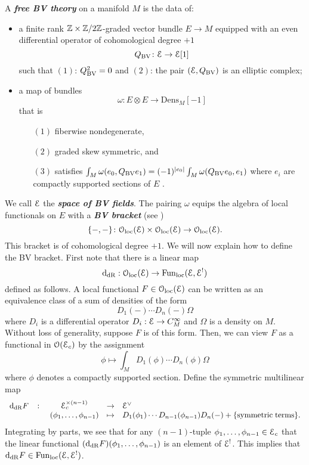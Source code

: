 \documentclass[10pt, oneside]{article}
\newcommand{\Dens}{\mathrm{Dens}}
\newcommand{\defterm}[1]{\textbf{\emph{#1}}}
\begin{document}
\begin{definition}
A \defterm{free BV theory} on a manifold $M$ is the data of:
\begin{itemize}
\item a finite rank $\mathbb Z\times\mathbb Z/2\mathbb Z$-graded vector bundle $E \to M$ equipped with an even differential operator of cohomological degree $+1$
\[
Q_{\mathrm{BV}} \colon \mathcal E \to \mathcal E [1] 
\]
such that $(1)$: $Q_{\mathrm{BV}}^2 = 0$ and $(2)$: the pair $(\mathcal E , Q_{\mathrm{BV}})$ is an elliptic complex;
\item a map of bundles
\[
\omega\colon E \otimes E \to \Dens_M [-1]
\]
that is
\begin{enumerate}
\item[$(1)$] fiberwise nondegenerate,
\item[$(2)$] graded skew symmetric, and
\item[$(3)$] satisfies $\int_M \omega(e_0, Q_{\mathrm{BV}} e_1) = (-1)^{|e_0|} \int_M \omega(Q_{\mathrm{BV}} e_0, e_1)$ where $e_i$ are compactly supported sections of $E$ .
\end{enumerate}
\end{itemize}
\end{definition}

We call $\mathcal E$ the \defterm{space of BV fields}. The pairing $\omega$ equips the algebra of local functionals on $E$ with a \defterm{BV bracket} (see \cite[Chapter 5.3]{CostelloBook}) 
\[
\{-,-\}\colon \mathcal{O}_{\rm loc}(\mathcal E) \times \mathcal{O}_{\rm loc}(\mathcal E) \to \mathcal{O}_{\rm loc}(\mathcal E) .
\]
This bracket is of cohomological degree $+1$. 
We will now explain how to define the BV bracket.  First note that there is a linear map
\[
{\rm d}_{\mathrm{dR}} : \mathcal{O}_{\rm loc}(\mathcal E) \to {\rm Fun}_{\rm loc}(\mathcal E, \mathcal E^!) 
\]
defined as follows. 
A local functional $F \in  \mathcal{O}_{\rm loc}(\mathcal E)$ can be written as an equivalence class of a sum of densities of the form
\[
D_1(-) \cdots D_n(-) \Omega
\]
where $D_i$ is a differential operator $D_i : \mathcal E \to C^\infty_M$ and $\Omega$ is a density on $M$. 
Without loss of generality, suppose $F$ is of this form. 
Then, we can view $F$ as a functional in $\mathcal O(\mathcal E_c)$ by the assignment
\[
\phi \mapsto \int_M D_1(\phi) \cdots D_n(\phi) \Omega
\]
where $\phi$ denotes a compactly supported section. 
Define the symmetric multilinear map
\[
\begin{array}{ccccl}
{\rm d}_{\mathrm{dR}} F & \colon & \mathcal E_c^{\times (n-1)} & \to & \mathcal E^\vee \\
& & (\phi_1, \ldots, \phi_{n-1}) & \mapsto & D_1(\phi_1) \cdots D_{n-1}(\phi_{n-1}) D_{n} (-) + \{{\rm symmetric\;terms}\} .
\end{array}
\]
Integrating by parts, we see that for any $(n-1)$-tuple $\phi_1, \ldots, \phi_{n-1} \in \mathcal E_c$ that the linear functional $({\rm d}_{\mathrm{dR}} F) (\phi_1,\ldots, \phi_{n-1})$ is an element of $\mathcal E^!$. 
This implies that ${\rm d}_{\mathrm{dR}} F \in {\rm Fun}_{\rm loc}(\mathcal E, \mathcal E^!)$.
\end{document}
